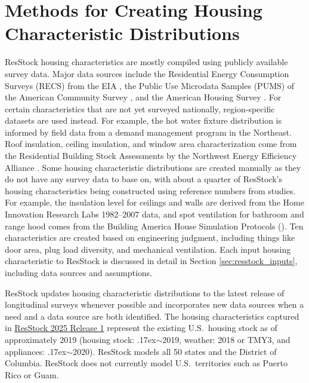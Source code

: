 \section{Methods for Creating Housing Characteristic Distributions}\label{hc_method}
ResStock housing characteristics are mostly compiled using publicly available survey data. Major data sources include the Residential Energy Consumption Surveys (RECS) from the EIA \citep{RECS2020}, the Public Use Microdata Samples (PUMS) of the American Community Survey \citep{PUMS}, and the American Housing Survey \citep{AHS}. For certain characteristics that are not yet surveyed nationally, region-specific datasets are used instead. For example, the hot water fixture distribution is informed by field data from a demand management program in the Northeast. Roof insulation, ceiling insulation, and window area characterization come from the Residential Building Stock Assessments by the Northwest Energy Efficiency Alliance \citep{RBSA}. Some housing characteristic distributions are created manually as they do not have any survey data to base on, with about a quarter of ResStock's housing characteristics being constructed using reference numbers from studies. For example, the insulation level for ceilings and walls are derived from the Home Innovation Research Labs 1982--2007 data, and spot ventilation for bathroom and range hood comes from the Building America House Simulation Protocols (\cite{Wilson2014}). Ten characteristics are created based on engineering judgment, including things like door area, plug load diversity, and mechanical ventilation. Each input housing characteristic to ResStock is discussed in detail in Section \ref{sec:resstock_inputs}, including data sources and assumptions.

ResStock updates housing characteristic distributions to the latest release of longitudinal surveys whenever possible and incorporates new data sources when a need and a data source are both identified. The housing characteristics captured in \href{https://github.com/NREL/resstock/releases/tag/2025_Release_1}{ResStock 2025 Release 1} represent the existing U.S.~housing stock as of approximately 2019 (housing stock: {\raise.17ex\hbox{$\scriptstyle\sim$}}2019, weather: 2018 or TMY3, and appliances: {\raise.17ex\hbox{$\scriptstyle\sim$}}2020). ResStock models all 50 states and the District of Columbia. ResStock does not currently model U.S.~territories such as Puerto Rico or Guam.

